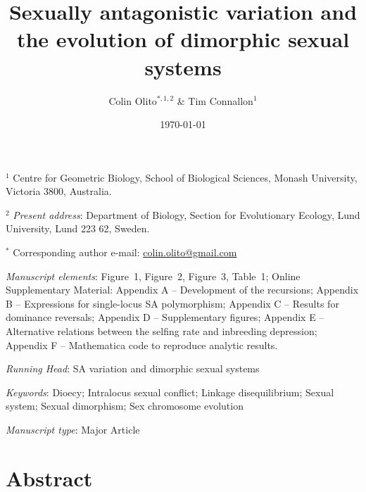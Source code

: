 \documentclass{article}
\title{Sexually antagonistic variation and the evolution of dimorphic sexual systems}
\author{Colin Olito$^{\ast,1,2}$ \& Tim Connallon$^{1}$}
\date{\today}
\begin{document}
\maketitle


\noindent{} $^{1}$ Centre for Geometric Biology, School of Biological Sciences, Monash University, Victoria 3800, Australia.

\noindent{} $^{2}$ \textit{Present address}: Department of Biology, Section for Evolutionary Ecology, Lund University, Lund 223 62, Sweden.

\noindent{} $^{\ast}$ Corresponding author e-mail: \url{colin.olito@gmail.com}

\bigskip

\noindent{} \textit{Manuscript elements}: Figure~1, Figure~2, Figure~3, Table~1; Online Supplementary Material: Appendix A -- Development of the recursions; Appendix B -- Expressions for single-locus SA polymorphism; Appendix C -- Results for dominance reversals; Appendix D -- Supplementary figures; Appendix E -- Alternative relations between the selfing rate and inbreeding depression; Appendix F -- Mathematica code to reproduce analytic results.

\bigskip
\noindent{} \textit{Running Head}: SA variation and dimorphic sexual systems

\bigskip

\noindent{} \textit{Keywords}: Dioecy; Intralocus sexual conflict; Linkage disequilibrium; Sexual system; Sexual dimorphism; Sex chromosome evolution

\bigskip

\noindent{} \textit{Manuscript type}: Major Article

\bigskip


\linenumbers
\modulolinenumbers[1]
\renewcommand\linenumberfont{\normalfont\small}


\newpage{}
\section*{Abstract}
\end{document}
